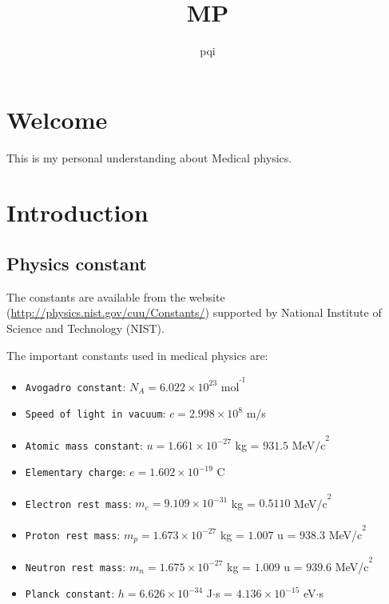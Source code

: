 \documentclass[]{book}
\title{MP}
\author{pqi}
\date{}
\providecommand{\tightlist}{%
  \setlength{\itemsep}{0pt}\setlength{\parskip}{0pt}}
\theoremstyle{definition}
\theoremstyle{definition}
\theoremstyle{definition}
\theoremstyle{remark}
\begin{document}
\maketitle

{
\setcounter{tocdepth}{1}
\tableofcontents
}
\chapter*{Welcome}\label{welcome}

This is my personal understanding about Medical physics.

\chapter{Introduction}\label{intro}

\section{Physics constant}\label{constants}

The constants are available from the website
(\url{http://physics.nist.gov/cuu/Constants/}) supported by National
Institute of Science and Technology (NIST).

The important constants used in medical physics are:

\begin{itemize}
\tightlist
\item
  \texttt{Avogadro\ constant}: \(N_A = 6.022\times10^{23}\)
  mol\textsuperscript{\textsuperscript{-1}}
\item
  \texttt{Speed\ of\ light\ in\ vacuum}: \(c = 2.998\times10^8\) m/s
\item
  \texttt{Atomic\ mass\ constant}: \(u = 1.661\times10^{−27}\) kg =
  \(931.5\) MeV/c\textsuperscript{\textsuperscript{2}}
\item
  \texttt{Elementary\ charge}: \(e = 1.602\times10^{−19}\) C
\item
  \texttt{Electron\ rest\ mass}: \(m_e = 9.109\times10^{−31}\) kg =
  \(0.5110\) MeV/c\textsuperscript{\textsuperscript{2}}
\item
  \texttt{Proton\ rest\ mass}: \(m_p = 1.673\times10^{−27}\) kg =
  \(1.007\) u = \(938.3\) MeV/c\textsuperscript{\textsuperscript{2}}
\item
  \texttt{Neutron\ rest\ mass}: \(m_n = 1.675\times10^{−27}\) kg =
  \(1.009\) u = \(939.6\) MeV/c\textsuperscript{\textsuperscript{2}}
\item
  \texttt{Planck\ constant}: \(h = 6.626×10^{−34}\) J\(\cdot\)s =
  \(4.136\times10^{−15}\) eV\(\cdot\)s
\end{itemize}
\end{document}
